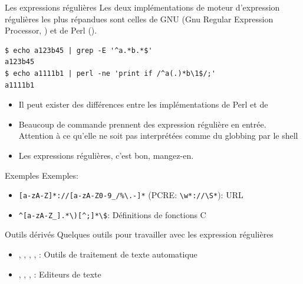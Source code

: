 \begin{frame}[fragile=singleslide]{Les expressions régulières}
  Les deux implémentations de  moteur d'expression régulières les plus
  répandues  sont celles  de  GNU (Gnu  Regular Expression  Processor,
  ) et de Perl ().
  \begin{lstlisting}
$ echo a123b45 | grep -E '^a.*b.*$'
a123b45
$ echo a1111b1 | perl -ne 'print if /^a(.)*b\1$/;'
a1111b1
  \end{lstlisting}
  \begin{itemize}
  \item Il  peut exister des différences entre  les implémentations de
    Perl et de 
  \item  Beaucoup de  commande  prennent des  expression régulière  en
    entrée. Attention à  ce qu'elle ne soit pas  interprétées comme du
    globbing par le shell
  \item Les expressions régulières, c'est bon, mangez-en.
  \end{itemize}
\end{frame}

\begin{frame}[fragile=singleslide]{Exemples}
  Exemples:
  \begin{itemize} 
  \item          \verb+[a-zA-Z]*://[a-zA-Z0-9_/%\.-]*+          (PCRE:
    \verb+\w*://\S*+): URL
  \item \verb+^[a-zA-Z_].*\)[^;]*\$+: Définitions de fonctions C
  \end{itemize} 
\end{frame} 

\begin{frame}[fragile=singleslide]{Outils dérivés}
  Quelques outils pour travailler avec les expression régulières
  \begin{itemize}
  \item  {}, ,  , ,  :
    Outils de traitement de texte automatique
  \item {}, , , : Editeurs de texte
  \end{itemize}
\end{frame}

